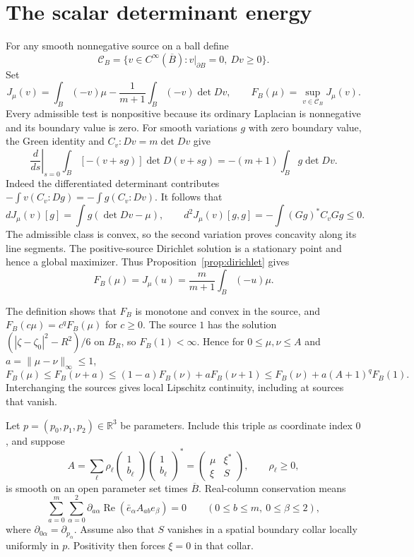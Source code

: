 \documentclass[11pt]{article}
\numberwithin{equation}{section}
\newcommand{\R}{\mathbb R}
\newcommand{\Rea}{\operatorname{Re}}
\begin{document}
\section{The scalar determinant energy}

For any smooth nonnegative source on a ball define
\[
 \mathcal C_B=\{v\in C^\infty(\overline B):v|_{\partial B}=0,\ Dv\ge0\}.
\]
Set
\[
 J_\mu(v)=\int_B(-v)\mu-\frac1{m+1}\int_B(-v)\det Dv,
 \qquad F_B(\mu)=\sup_{v\in\mathcal C_B}J_\mu(v).
\]
Every admissible test is nonpositive because its ordinary Laplacian
is nonnegative and its boundary value is zero.
For smooth variations $g$ with zero boundary value, the Green
identity and $C_v:Dv=m\det Dv$ give
\[
 \left.\frac{d}{ds}\right|_{s=0}
       \int_B[-(v+sg)]\det D(v+sg)
       =-(m+1)\int_B g\det Dv.
\]
Indeed the differentiated determinant contributes
$-\int v(C_v:Dg)=-\int g(C_v:Dv)$.
It follows that
\[
 dJ_\mu(v)[g]=\int g(\det Dv-\mu),\qquad
 d^2J_\mu(v)[g,g]=-\int(Gg)^*C_vGg\le0.
\]
The admissible class is convex, so the second variation proves
concavity along its line segments. The positive-source Dirichlet
solution is a stationary point and hence a global maximizer. Thus
Proposition~\ref{prop:dirichlet} gives
\begin{equation}\label{eq:value}
 F_B(\mu)=J_\mu(u)=\frac m{m+1}\int_B(-u)\mu.
\end{equation}

The definition shows that $F_B$ is monotone and convex in the source,
and $F_B(c\mu)=c^qF_B(\mu)$ for $c\ge0$.
The source $1$ has the solution $(|\zeta-\zeta_0|^2-R^2)/6$ on $B_R$,
so $F_B(1)<\infty$. Hence for $0\le\mu,\nu\le A$ and
$a=\|\mu-\nu\|_\infty\le1$,
\begin{equation}\label{eq:continuity}
 F_B(\mu)\le F_B(\nu+a)
 \le(1-a)F_B(\nu)+aF_B(\nu+1)
 \le F_B(\nu)+a(A+1)^qF_B(1).
\end{equation}
Interchanging the sources gives local Lipschitz continuity, including
at sources that vanish.

Let $p=(p_0,p_1,p_2)\in\R^3$ be parameters. Include this triple as
coordinate index $0$, and suppose
\[
 A=\sum_\ell\rho_\ell
       \begin{pmatrix}1\\b_\ell\end{pmatrix}
       \begin{pmatrix}1\\b_\ell\end{pmatrix}^{\!*}
   =\begin{pmatrix}\mu&\xi^*\\\xi&S\end{pmatrix},\qquad\rho_\ell\ge0,
\]
is smooth on an open parameter set times $\overline B$.
Real-column conservation means
\begin{equation}\label{eq:realconservation}
 \sum_{a=0}^m\sum_{\alpha=0}^2
 \partial_{a\alpha}\Rea(\bar e_\alpha A_{ab}e_\beta)=0
 \qquad(0\le b\le m,\ 0\le\beta\le2),
\end{equation}
where $\partial_{0\alpha}=\partial_{p_\alpha}$.
Assume also that $S$ vanishes in a spatial boundary collar locally
uniformly in $p$. Positivity then forces $\xi=0$ in that collar.
\end{document}
